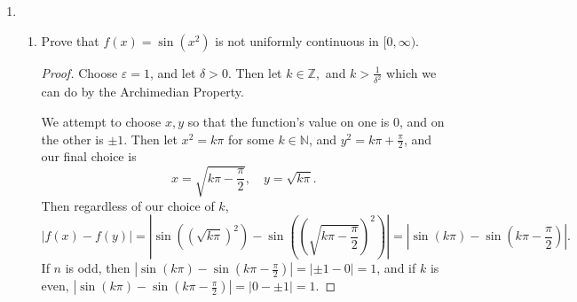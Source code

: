 \documentclass{article}
\begin{document}
\begin{enumerate}
\begin{enumerate}
\begin{proof}
        \end{proof}

        \item For $a>0$ find the sum of the series
        $$\sum_{k=2}^\infty\left(\frac a{a+1}\right)^k\quad\text{(show your work)}$$

        \paragraph{Solution: }We notice a geometric series; since $a>0$,we can say $a<a+1$ and $\frac{a}{a+1}<1$.
        Then the sum is given by:
        \begin{align*}
            \left(\frac{a}{a+1}\right)^2 \frac{1}{1-\frac{a}{a+1}}
            &= \left(\frac{a}{a+1}\right)^2 \frac{1}{\frac{a+1}{a+1}-\frac{a}{a+1}}\\
            &= \left(\frac{a}{a+1}\right)^2 \frac{1}{\frac{1}{a+1}}\\
            &= \left(\frac{a}{a+1}\right)^2 (a+1)\\
            &=\frac{a^2}{a+1}
        .\end{align*}

    \end{enumerate}
    \newpage
\item \begin{enumerate}
        \item Prove that $f\left(x\right)=\sin\left(x^{2}\right)$ is not uniformly continuous in $[0,\infty).$
            \begin{proof} 

                Choose $\varepsilon=1$, and let $\delta>0$. Then let $k\in \mathbb{Z}, $ and $k>\frac{1}{\delta^2}$ 
                which we can do by the Archimedian Property.

                We attempt to choose $x,y$ so that the function's value on one is $0$, and on the other
                is $\pm 1$. Then let $x^2=k\pi$ for some $k\in \mathbb{N}$, and $y^2= k\pi+\frac{\pi}{2}$, 
                and our final choice is 
                \[
                x=\sqrt{k\pi-\frac{\pi}{2}},\quad y=\sqrt{k\pi}
                .\] 
                Then regardless of our choice of $k$, 
                \[
                |f(x)-f(y)|=
                \left|\sin\left(\left(\sqrt{ k\pi}\right)^2\right)
                -\sin\left(\left(\sqrt{ k\pi-\frac{\pi}{2}}\right)^2\right)\right|
                =\left|\sin(k\pi)-\sin\left(k\pi-\frac{\pi}{2}\right)\right|.
                \] 
                If $n$ is odd, then 
                $|\sin(k\pi)-\sin\left(k\pi-\frac{\pi}{2}\right)|=|\pm 1 -0|=1$, and if $k$ is even,
                $|\sin(k\pi)-\sin\left(k\pi-\frac{\pi}{2}\right)|=|0 -\pm 1|=1$.


\end{proof}
\end{enumerate}
\end{enumerate}
\end{document}
